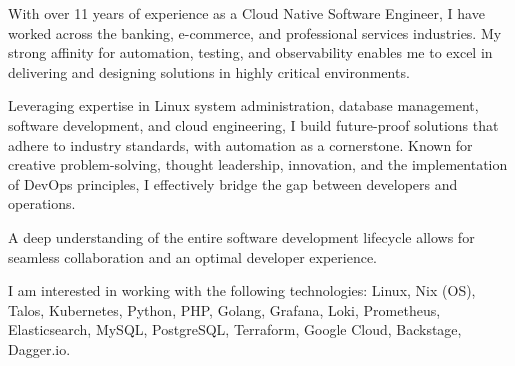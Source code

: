 
\begin{cvparagraph}
With over 11 years of experience as a Cloud Native Software Engineer, I have worked across the banking, e-commerce, and professional services industries. 
My strong affinity for automation, testing, and observability enables me to excel in delivering and designing solutions in highly critical environments. 

Leveraging expertise in Linux system administration, database management, software development, and cloud engineering, 
I build future-proof solutions that adhere to industry standards, with automation as a cornerstone. Known for creative problem-solving, thought leadership, innovation, and the implementation of DevOps principles, I effectively bridge the gap between developers and operations. 

A deep understanding of the entire software development lifecycle allows for seamless collaboration and an optimal developer experience. 

I am interested in working with the following technologies: Linux, Nix (OS), Talos, Kubernetes, Python, PHP, Golang, Grafana, Loki, Prometheus, Elasticsearch,
 MySQL, PostgreSQL, Terraform, Google Cloud, Backstage, Dagger.io.




\end{cvparagraph}

